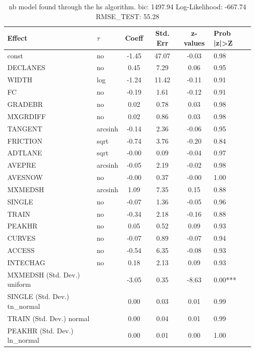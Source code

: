 \begin{table}
	\caption{nb model found through the hs algorithm. bic: 1497.94 Log-Likelihood: -667.74 RMSE_TEST: 55.28}
	\begin{center}
		\begin{tabular}{|l|l|c|c|c|l|}
			\hline
			Effect & $\tau$ & Coeff & Std. Err & z-values & Prob |z|>Z \\
			\hline
			const & no & -1.45 & 47.07 & -0.03 & 0.98 \\
			\hline
			DECLANES & no & 0.45 & 7.29 & 0.06 & 0.95 \\
			\hline
			WIDTH & log & -1.24 & 11.42 & -0.11 & 0.91 \\
			\hline
			FC & no & -0.19 & 1.61 & -0.12 & 0.91 \\
			\hline
			GRADEBR & no & 0.02 & 0.78 & 0.03 & 0.98 \\
			\hline
			MXGRDIFF & no & 0.02 & 0.86 & 0.03 & 0.98 \\
			\hline
			TANGENT & arcsinh & -0.14 & 2.36 & -0.06 & 0.95 \\
			\hline
			FRICTION & sqrt & -0.74 & 3.76 & -0.20 & 0.84 \\
			\hline
			ADTLANE & sqrt & -0.00 & 0.09 & -0.04 & 0.97 \\
			\hline
			AVEPRE & arcsinh & -0.05 & 2.19 & -0.02 & 0.98 \\
			\hline
			AVESNOW & no & -0.00 & 0.37 & -0.00 & 1.00 \\
			\hline
			MXMEDSH & arcsinh & 1.09 & 7.35 & 0.15 & 0.88 \\
			\hline
			SINGLE & no & -0.07 & 1.36 & -0.05 & 0.96 \\
			\hline
			TRAIN & no & -0.34 & 2.18 & -0.16 & 0.88 \\
			\hline
			PEAKHR & no & 0.05 & 0.52 & 0.09 & 0.93 \\
			\hline
			CURVES & no & -0.07 & 0.89 & -0.07 & 0.94 \\
			\hline
			ACCESS & no & -0.54 & 6.35 & -0.08 & 0.93 \\
			\hline
			INTECHAG & no & 0.18 & 2.13 & 0.09 & 0.93 \\
			\hline
			MXMEDSH (Std. Dev.) uniform &  & -3.05 & 0.35 & -8.63 & 0.00*** \\
			\hline
			SINGLE (Std. Dev.) tn_normal &  & 0.00 & 0.03 & 0.01 & 0.99 \\
			\hline
			TRAIN (Std. Dev.) normal &  & 0.00 & 0.04 & 0.01 & 0.99 \\
			\hline
			PEAKHR (Std. Dev.) ln_normal &  & 0.00 & 0.01 & 0.00 & 1.00 \\

\end{tabular}
\end{center}
\end{table}
